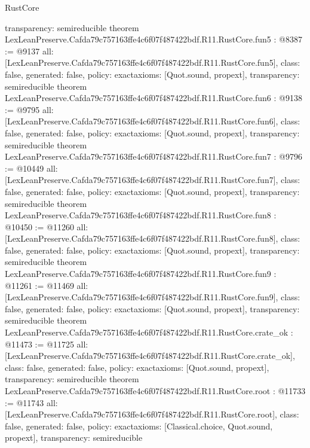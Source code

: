 \begin{lexlean}{RustCore}
\begin{coremodule}
{  transparency: semireducible
}
theorem LexLeanPreserve.Cafda79c757163ffe4c6f07f487422bdf.R11.RustCore.fun5 : @8387 := @9137 {
  all: [LexLeanPreserve.Cafda79c757163ffe4c6f07f487422bdf.R11.RustCore.fun5],
  class: false,
  generated: false,
  policy: exact{axioms: [Quot.sound, propext]},
  transparency: semireducible
}
theorem LexLeanPreserve.Cafda79c757163ffe4c6f07f487422bdf.R11.RustCore.fun6 : @9138 := @9795 {
  all: [LexLeanPreserve.Cafda79c757163ffe4c6f07f487422bdf.R11.RustCore.fun6],
  class: false,
  generated: false,
  policy: exact{axioms: [Quot.sound, propext]},
  transparency: semireducible
}
theorem LexLeanPreserve.Cafda79c757163ffe4c6f07f487422bdf.R11.RustCore.fun7 : @9796 := @10449 {
  all: [LexLeanPreserve.Cafda79c757163ffe4c6f07f487422bdf.R11.RustCore.fun7],
  class: false,
  generated: false,
  policy: exact{axioms: [Quot.sound, propext]},
  transparency: semireducible
}
theorem LexLeanPreserve.Cafda79c757163ffe4c6f07f487422bdf.R11.RustCore.fun8 : @10450 := @11260 {
  all: [LexLeanPreserve.Cafda79c757163ffe4c6f07f487422bdf.R11.RustCore.fun8],
  class: false,
  generated: false,
  policy: exact{axioms: [Quot.sound, propext]},
  transparency: semireducible
}
theorem LexLeanPreserve.Cafda79c757163ffe4c6f07f487422bdf.R11.RustCore.fun9 : @11261 := @11469 {
  all: [LexLeanPreserve.Cafda79c757163ffe4c6f07f487422bdf.R11.RustCore.fun9],
  class: false,
  generated: false,
  policy: exact{axioms: [Quot.sound, propext]},
  transparency: semireducible
}
theorem LexLeanPreserve.Cafda79c757163ffe4c6f07f487422bdf.R11.RustCore.crate_ok : @11473 := @11725 {
  all: [LexLeanPreserve.Cafda79c757163ffe4c6f07f487422bdf.R11.RustCore.crate_ok],
  class: false,
  generated: false,
  policy: exact{axioms: [Quot.sound, propext]},
  transparency: semireducible
}
theorem LexLeanPreserve.Cafda79c757163ffe4c6f07f487422bdf.R11.RustCore.root : @11733 := @11743 {
  all: [LexLeanPreserve.Cafda79c757163ffe4c6f07f487422bdf.R11.RustCore.root],
  class: false,
  generated: false,
  policy: exact{axioms: [Classical.choice, Quot.sound, propext]},
  transparency: semireducible
}


\end{coremodule}
\end{lexlean}
